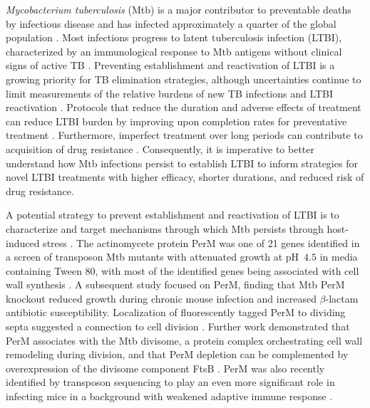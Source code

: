 \documentclass[twocolumn,pdflatex,sn-nature]{sn-jnl}%
\newcommand\mtb{Mtb}
\newcommand\mtbfull{\textit{Mycobacterium tuberculosis}}
\begin{document}
\mtbfull{} (\mtb{}) is a major contributor to preventable deaths by infectious disease and has infected approximately a quarter of the global population \citep{houbenGlobalBurdenLatent2016}. Most infections progress to latent tuberculosis infection (LTBI), characterized by an immunological response to \mtb{} antigens without clinical signs of active TB \citep{whoLatentTuberculosisInfection2018}. Preventing establishment and reactivation of LTBI is a growing priority for TB elimination strategies, although uncertainties continue to limit measurements of the relative burdens of new TB infections and LTBI reactivation \citep{daleQuantifyingRatesLate2021}. Protocols that reduce the duration and adverse effects of treatment can reduce LTBI burden by improving upon completion rates for preventative treatment \citep{assefaEfficacySafetyDifferent2023}. Furthermore, imperfect treatment over long periods can contribute to acquisition of drug resistance \citep{liAcquiredResistanceIsoniazid2021}. Consequently, it is imperative to better understand how \mtb{} infections persist to establish LTBI to inform strategies for novel LTBI treatments with higher efficacy, shorter durations, and reduced risk of drug resistance.

A potential strategy to prevent establishment and reactivation of LTBI is to characterize and target mechanisms through which \mtb{} persists through host-induced stress \citep{dartoisAntituberculosisTreatmentStrategies2022}. The actinomycete protein PerM was one of 21 genes identified in a screen of transposon \mtb{} mutants with attenuated growth at pH~$4.5$ in media containing Tween 80, with most of the identified genes being associated with cell wall synthesis \citep{vandalMembraneProteinPreserves2008}. A subsequent study focused on PerM, finding that \mtb{} PerM knockout reduced growth during chronic mouse infection and increased $\beta$-lactam antibiotic susceptibility. Localization of fluorescently tagged PerM to dividing septa suggested a connection to cell division \citep{goodsmithDisruptionTuberculosisMembrane2015}. Further work demonstrated that PerM associates with the \mtb{} divisome, a protein complex orchestrating cell wall remodeling during division, and that PerM depletion can be complemented by overexpression of the divisome component FtsB \citep{wangPersistentMycobacteriumTuberculosis2019}. PerM was also recently identified by transposon sequencing to play an even more significant role in infecting mice in a background with weakened adaptive immune response \citep{meadeGenomewideScreenIdentifies2023}.
\end{document}
